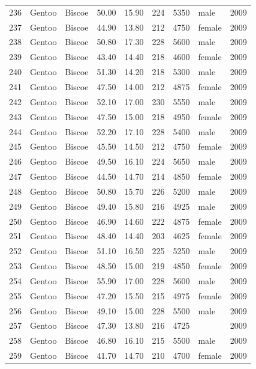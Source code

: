 \documentclass{article}\usepackage[]{graphicx}\usepackage[]{xcolor}
\begin{document}
\begin{table}[ht]
\begin{tabular}{rllrrrrlr}
  236 & Gentoo & Biscoe & 50.00 & 15.90 & 224 & 5350 & male & 2009 \\ 
  237 & Gentoo & Biscoe & 44.90 & 13.80 & 212 & 4750 & female & 2009 \\ 
  238 & Gentoo & Biscoe & 50.80 & 17.30 & 228 & 5600 & male & 2009 \\ 
  239 & Gentoo & Biscoe & 43.40 & 14.40 & 218 & 4600 & female & 2009 \\ 
  240 & Gentoo & Biscoe & 51.30 & 14.20 & 218 & 5300 & male & 2009 \\ 
  241 & Gentoo & Biscoe & 47.50 & 14.00 & 212 & 4875 & female & 2009 \\ 
  242 & Gentoo & Biscoe & 52.10 & 17.00 & 230 & 5550 & male & 2009 \\ 
  243 & Gentoo & Biscoe & 47.50 & 15.00 & 218 & 4950 & female & 2009 \\ 
  244 & Gentoo & Biscoe & 52.20 & 17.10 & 228 & 5400 & male & 2009 \\ 
  245 & Gentoo & Biscoe & 45.50 & 14.50 & 212 & 4750 & female & 2009 \\ 
  246 & Gentoo & Biscoe & 49.50 & 16.10 & 224 & 5650 & male & 2009 \\ 
  247 & Gentoo & Biscoe & 44.50 & 14.70 & 214 & 4850 & female & 2009 \\ 
  248 & Gentoo & Biscoe & 50.80 & 15.70 & 226 & 5200 & male & 2009 \\ 
  249 & Gentoo & Biscoe & 49.40 & 15.80 & 216 & 4925 & male & 2009 \\ 
  250 & Gentoo & Biscoe & 46.90 & 14.60 & 222 & 4875 & female & 2009 \\ 
  251 & Gentoo & Biscoe & 48.40 & 14.40 & 203 & 4625 & female & 2009 \\ 
  252 & Gentoo & Biscoe & 51.10 & 16.50 & 225 & 5250 & male & 2009 \\ 
  253 & Gentoo & Biscoe & 48.50 & 15.00 & 219 & 4850 & female & 2009 \\ 
  254 & Gentoo & Biscoe & 55.90 & 17.00 & 228 & 5600 & male & 2009 \\ 
  255 & Gentoo & Biscoe & 47.20 & 15.50 & 215 & 4975 & female & 2009 \\ 
  256 & Gentoo & Biscoe & 49.10 & 15.00 & 228 & 5500 & male & 2009 \\ 
  257 & Gentoo & Biscoe & 47.30 & 13.80 & 216 & 4725 &  & 2009 \\ 
  258 & Gentoo & Biscoe & 46.80 & 16.10 & 215 & 5500 & male & 2009 \\ 
  259 & Gentoo & Biscoe & 41.70 & 14.70 & 210 & 4700 & female & 2009 \\ 

\end{tabular}
\end{table}
\end{document}

